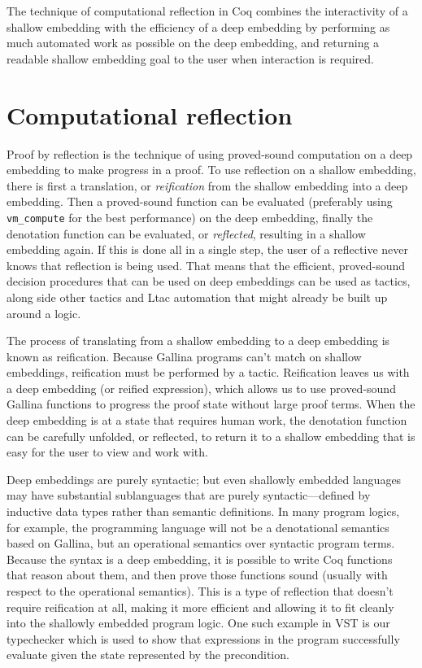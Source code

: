 \documentclass{puthesis}
\begin{document}
The technique of computational reflection in Coq combines the
interactivity of a shallow embedding with the efficiency of a deep
embedding by performing as much automated work as possible on the deep
embedding, and returning a readable shallow embedding goal to the user
when interaction is required.

\section{Computational reflection}
\label{sec:reflection}

Proof by reflection is the technique of using proved-sound computation
on a deep embedding to make progress in a proof. To use reflection on
a shallow embedding, there is first a translation, or
\emph{reification} from the shallow embedding into a deep
embedding. Then a proved-sound function can be evaluated (preferably
using \lstinline|vm_compute| for the best performance) on the deep
embedding, finally the denotation function can be evaluated, or
\emph{reflected}, resulting in a shallow embedding again.  If this is
done all in a single step, the user of a reflective never knows that
reflection is being used. That means that the efficient, proved-sound
decision procedures that can be used on deep embeddings can be used as
tactics, along side other tactics and Ltac automation that might
already be built up around a logic.

The process of translating from a shallow embedding to a deep
embedding is known as reification. Because Gallina programs can't
match on shallow embeddings, reification must be performed by a
tactic. Reification leaves us with a deep embedding (or reified
expression), which allows us to use proved-sound Gallina functions to
progress the proof state without large proof terms. When the deep
embedding is at a state that requires human work, the denotation
function can be carefully unfolded, or reflected, to return it to a
shallow embedding that is easy for the user to view and work with.


Deep embeddings are purely syntactic; but even shallowly embedded
languages may have substantial sublanguages that are purely
syntactic---defined by inductive data types rather than semantic
definitions. In many program logics, for example, the programming
language will not be a denotational semantics based on Gallina, but an
operational semantics over syntactic program terms. Because the syntax
is a deep embedding, it is possible to write Coq functions that reason
about them, and then prove those functions sound (usually with respect
to the operational semantics). This is a type of reflection that
doesn't require reification at all, making it more efficient and
allowing it to fit cleanly into the shallowly embedded program
logic. One such example in VST is our typechecker which is used to
show that expressions in the program successfully evaluate given the
state represented by the precondition.
\end{document}
